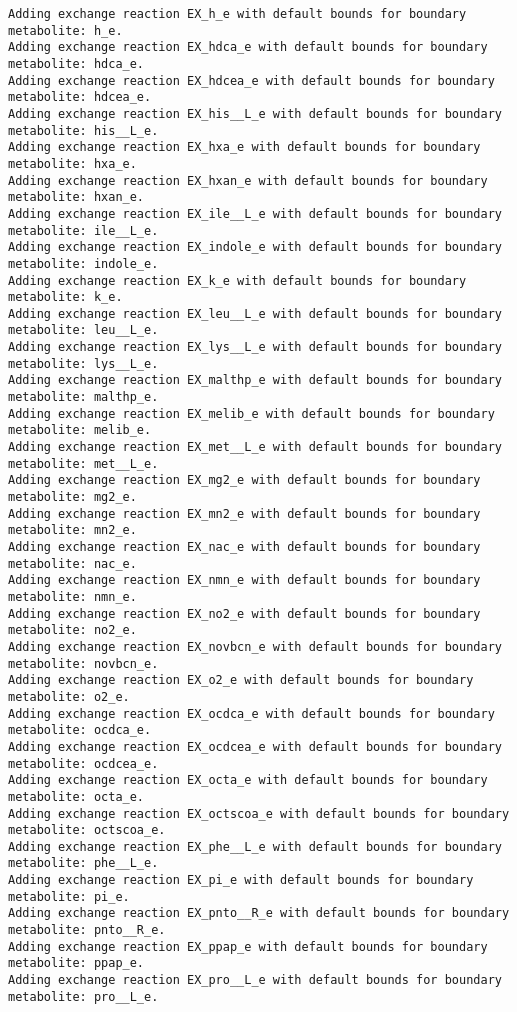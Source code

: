 \documentclass[
  letterpaper,
  DIV=11,
  numbers=noendperiod]{scrartcl}
\begin{document}
\begin{verbatim}
Adding exchange reaction EX_h_e with default bounds for boundary metabolite: h_e.
Adding exchange reaction EX_hdca_e with default bounds for boundary metabolite: hdca_e.
Adding exchange reaction EX_hdcea_e with default bounds for boundary metabolite: hdcea_e.
Adding exchange reaction EX_his__L_e with default bounds for boundary metabolite: his__L_e.
Adding exchange reaction EX_hxa_e with default bounds for boundary metabolite: hxa_e.
Adding exchange reaction EX_hxan_e with default bounds for boundary metabolite: hxan_e.
Adding exchange reaction EX_ile__L_e with default bounds for boundary metabolite: ile__L_e.
Adding exchange reaction EX_indole_e with default bounds for boundary metabolite: indole_e.
Adding exchange reaction EX_k_e with default bounds for boundary metabolite: k_e.
Adding exchange reaction EX_leu__L_e with default bounds for boundary metabolite: leu__L_e.
Adding exchange reaction EX_lys__L_e with default bounds for boundary metabolite: lys__L_e.
Adding exchange reaction EX_malthp_e with default bounds for boundary metabolite: malthp_e.
Adding exchange reaction EX_melib_e with default bounds for boundary metabolite: melib_e.
Adding exchange reaction EX_met__L_e with default bounds for boundary metabolite: met__L_e.
Adding exchange reaction EX_mg2_e with default bounds for boundary metabolite: mg2_e.
Adding exchange reaction EX_mn2_e with default bounds for boundary metabolite: mn2_e.
Adding exchange reaction EX_nac_e with default bounds for boundary metabolite: nac_e.
Adding exchange reaction EX_nmn_e with default bounds for boundary metabolite: nmn_e.
Adding exchange reaction EX_no2_e with default bounds for boundary metabolite: no2_e.
Adding exchange reaction EX_novbcn_e with default bounds for boundary metabolite: novbcn_e.
Adding exchange reaction EX_o2_e with default bounds for boundary metabolite: o2_e.
Adding exchange reaction EX_ocdca_e with default bounds for boundary metabolite: ocdca_e.
Adding exchange reaction EX_ocdcea_e with default bounds for boundary metabolite: ocdcea_e.
Adding exchange reaction EX_octa_e with default bounds for boundary metabolite: octa_e.
Adding exchange reaction EX_octscoa_e with default bounds for boundary metabolite: octscoa_e.
Adding exchange reaction EX_phe__L_e with default bounds for boundary metabolite: phe__L_e.
Adding exchange reaction EX_pi_e with default bounds for boundary metabolite: pi_e.
Adding exchange reaction EX_pnto__R_e with default bounds for boundary metabolite: pnto__R_e.
Adding exchange reaction EX_ppap_e with default bounds for boundary metabolite: ppap_e.
Adding exchange reaction EX_pro__L_e with default bounds for boundary metabolite: pro__L_e.

\end{verbatim}
\end{document}
